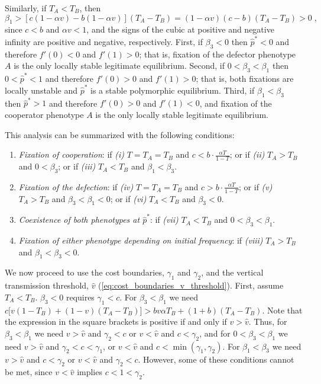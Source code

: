 \documentclass[12pt]{extarticle}
\begin{document}
\begin{appendices}
Similarly, if $T_A<T_B$, then
\begin{equation} \label{eq:beta1_rev}
   \beta_1 > [c(1-\alpha v) - b(1-\alpha v)] (T_A-T_B) 
   = (1-\alpha v)(c-b)(T_A-T_B) > 0 \;,
 \end{equation}
since $c<b$ and $\alpha v < 1$, and the signs of the cubic at positive and negative infinity are positive and negative, respectively. 
First, if $\beta_3<0$ then $\hat{p}^*<0$ and therefore $f'(0)<0$ and $f'(1)>0$; that is, fixation of the defector phenotype $A$ is the only locally stable legitimate equilibrium.
Second, if $0<\beta_3<\beta_1$ then $0<\hat{p}^*<1$ and therefore $f'(0)>0$ and $f'(1)>0$; that is, both fixations are locally unstable and $\hat{p}^*$ is a stable polymorphic equilibrium.
Third, if $\beta_1<\beta_3$ then $\hat{p}^*>1$ and therefore $f'(0)>0$ and $f'(1)<0$, and fixation of the cooperator phenotype $A$ is the only locally stable legitimate equilibrium.

This analysis can be summarized with the following conditions:
\begin{enumerate}
\item \emph{Fixation of cooperation}: 
	if \emph{(i)} $T=T_A=T_B$ and $c < b\cdot \frac{\alpha T}{1-T}$; or
	if \emph{(ii)} $T_A>T_B$ and $0<\beta_3$; or 
	if \emph{(iii)} $T_A<T_B$ and $\beta_1<\beta_3$.
\item \emph{Fixation of the defection}: 
	if \emph{(iv)}  $T=T_A=T_B$ and $c > b\cdot \frac{\alpha T}{1-T}$; or 
	if \emph{(v)} $T_A>T_B$ and $\beta_3<\beta_1<0$; or 
	if \emph{(vi)} $T_A<T_B$ and $\beta_3<0$.
\item \emph{Coexistence of both phenotypes at $\hat{p}^*$}: 
	if \emph{(vii)} $T_A < T_B$ and $0<\beta_3<\beta_1$.
\item \emph{Fixation of either phenotype depending on initial frequency}:
	if \emph{(viii)}  $T_A>T_B$ and $\beta_1<\beta_3<0$.
\end{enumerate}

We now proceed to use the cost boundaries, $\gamma_1$ and $\gamma_2$, and the vertical transmission threshold, $\hat v$ (\autoref{eq:cost_boundaries_v_threshold}).
First, assume $T_A<T_B$.
$\beta_3<0$ requires $\gamma_1<c$.
For $\beta_3<\beta_1$ we need $c\big[v(1-T_B) + (1-v)(T_A-T_B)\big] > bv\alpha T_B + (1+b)(T_A-T_B)$.
Note that the expression in the square brackets is positive if and only if $v > \hat v$.
Thus, for $\beta_3<\beta_1$ we need $v > \hat v$ and $\gamma_2 < c$ or $v < \hat v$ and $c < \gamma_2$,
and for $0<\beta_3<\beta_1$ we need $v > \hat v$ and $\gamma_2 < c < \gamma_1$, or $v < \hat v$ and $c < \min(\gamma_1, \gamma_2)$. For $\beta_1<\beta_3$ we need $v > \hat v$ and $c<\gamma_2$ or $v < \hat v$ and $\gamma_2<c$.
However, some of these conditions cannot be met, since $v < \hat v$ implies $c<1<\gamma_2$.


\end{appendices}
\end{document}
